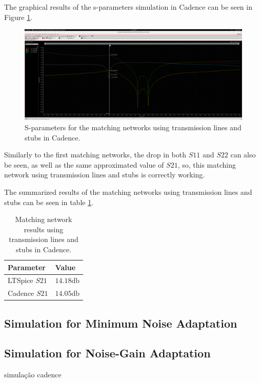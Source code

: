 The graphical results of the s-parameters simulation in Cadence can be seen in Figure \ref{fig:SIMLSMatching}.
\begin{figure}[H]
    \centering
    \includegraphics[width=1\textwidth]{Images/CAD-LinesmatchGain.png}
    \caption{S-parameters for the matching networks using transmission lines and stubs in Cadence.}
    \label{fig:SIMLSMatching}
\end{figure}

Similarly to the first matching networks, the drop in both $S11$ and $S22$ can also be seen, as well as the same approximated value of $S21$, so, this matching network using transmission lines and stubs is correctly working. 

The summarized results of the matching networks using transmission lines and stubs can be seen in table \ref{tab:LSMatchingParameters}.
\begin{table}[H]
    \centering
    \caption{Matching network results using transmission lines and stubs in Cadence.}
    \begin{tabularx}{\textwidth}{>{\centering\arraybackslash}X >{\centering\arraybackslash}X}
        \toprule
        \textbf{Parameter} & \textbf{Value} \\
        \midrule
        LTSpice $S21$  & $14.18 \si{\decibel}$ \\
        \midrule
        Cadence $S21$ & $14.05 \si{\decibel}$ \\
        \bottomrule
    \end{tabularx}
    \label{tab:LSMatchingParameters}
\end{table}

\subsection{Simulation for Minimum Noise Adaptation}

\subsection{Simulation for Noise-Gain Adaptation}

simulação cadence
